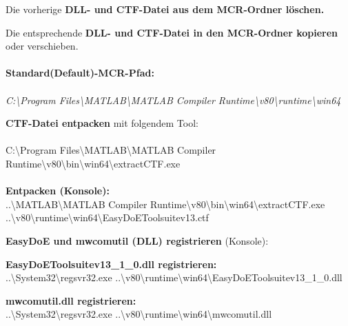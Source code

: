 \documentclass[a4paper,11pt]{article}
\begin{document}
\begin{regDll}
\begin{regDll}
\begin{regDll}
\begin{regDll}
				\item Die vorherige \textbf{DLL- und CTF-Datei aus dem MCR-Ordner löschen.}
				\\
			\end{regDll}
		
			\item Die entsprechende \textbf{DLL- und CTF-Datei in den MCR-Ordner kopieren} 
			\\ oder verschieben.
			\\ \\ \textbf{Standard(Default)-MCR-Pfad:}
			\\
			\\ \hspace*{5mm} \textit{C:\textbackslash{}Program Files\textbackslash{}MATLAB\textbackslash{}MATLAB Compiler Runtime\textbackslash{}v80\textbackslash{}runtime\textbackslash{}win64}
			\\ 

			\item \textbf{CTF-Datei entpacken} mit folgendem Tool:
			\\
			\\ \hspace*{5mm} C:\textbackslash{}Program Files\textbackslash{}MATLAB\textbackslash{}MATLAB Compiler Runtime\textbackslash{}v80\textbackslash{}bin\textbackslash{}win64\textbackslash{}extractCTF.exe
			\\
			\\ \textbf{Entpacken (Konsole):} 
			\\ \hspace*{5mm} ..\textbackslash{}MATLAB\textbackslash{}MATLAB Compiler Runtime\textbackslash{}v80\textbackslash{}bin\textbackslash{}win64\textbackslash{}extractCTF.exe
			\\ \hspace*{5mm} ..\textbackslash{}v80\textbackslash{}runtime\textbackslash{}win64\textbackslash{}EasyDoEToolsuitev13.ctf
			\\
			
			\item \textbf{EasyDoE und mwcomutil (DLL) registrieren} (Konsole):
			\\
			\begin{regDll}
			\item \textbf{EasyDoEToolsuitev13\_1\_0.dll registrieren:}
			\\
			..\textbackslash{}System32\textbackslash{}regsvr32.exe
			..\textbackslash{}v80\textbackslash{}runtime\textbackslash{}win64\textbackslash{}EasyDoEToolsuitev13\_1\_0.dll
			\\
			\item \textbf{mwcomutil.dll registrieren:}
			\\
			..\textbackslash{}System32\textbackslash{}regsvr32.exe
			..\textbackslash{}v80\textbackslash{}runtime\textbackslash{}win64\textbackslash{}mwcomutil.dll
			\\
			

\end{regDll}
\end{regDll}
\end{regDll}
\end{regDll}
\end{document}
